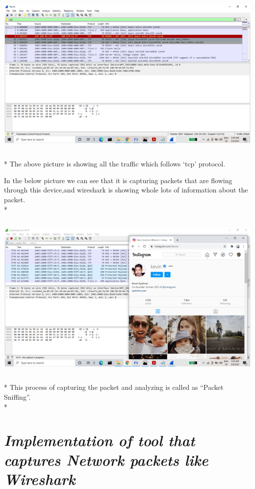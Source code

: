 \documentclass[12pt, a4paper]{report}
\begin{document}
\includegraphics[width=6.26772in,height=3.52778in]{image8.png}
\\*
The above picture is showing all the traffic which follows `tcp'
protocol.

In the below picture we can see that it is capturing packets that are
flowing through this device,and wireshark is showing whole lots of
information about the packet.
\\*
\includegraphics[width=6.26772in,height=3.52778in]{image10.png}
\\*
This process of capturing the packet and analyzing is called as ``Packet
Sniffing''.
\\*


\chapter{\emph{Implementation of tool that captures Network packets like
Wireshark} }
\end{document}

